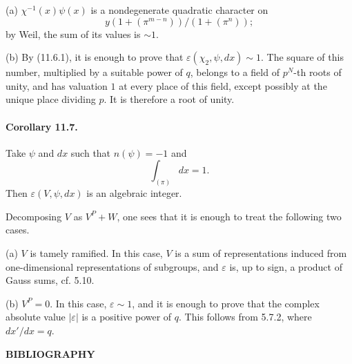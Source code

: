 \documentclass[10pt]{article}
\begin{document}
(a) \(\chi^{-1}(x)\psi(x)\) is a nondegenerate quadratic character on
\[
y(1+(\pi^{m-n}))/(1+(\pi^n));
\]
by Weil, the sum of its values is \(\sim1\).

(b) By (11.6.1), it is enough to prove that \(\varepsilon(\chi_2,\psi,dx)\sim1\). The square of this number, multiplied by a suitable power of \(q\), belongs to a field of \(p^N\)-th roots of unity, and has valuation \(1\) at every place of this field, except possibly at the unique place dividing \(p\). It is therefore a root of unity.

\paragraph{Corollary 11.7.} Take \(\psi\) and \(dx\) such that \(n(\psi)=-1\) and
\[
\int_{(\pi)}dx=1.
\]
Then \(\varepsilon(V,\psi,dx)\) is an algebraic integer.

Decomposing \(V\) as \(V^P+W\), one sees that it is enough to treat the following two cases.

(a) \(V\) is tamely ramified. In this case, \(V\) is a sum of representations induced from one-dimensional representations of subgroups, and \(\varepsilon\) is, up to sign, a product of Gauss sums, cf. 5.10.

(b) \(V^P=0\). In this case, \(\varepsilon\sim1\), and it is enough to prove that the complex absolute value \(|\varepsilon|\) is a positive power of \(q\). This follows from 5.7.2, where \(dx'/dx=q\).

\begin{center}
\bfseries BIBLIOGRAPHY
\end{center}
\end{document}
